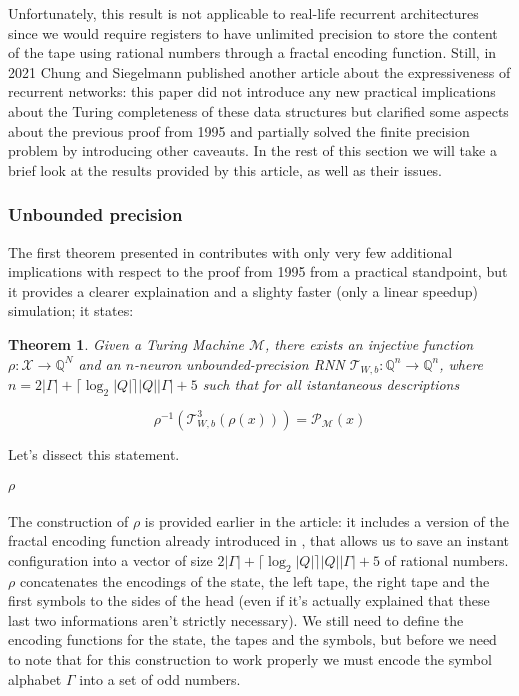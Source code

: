 \documentclass{article}
\newtheorem{theorem}{Theorem}
\begin{document}
Unfortunately, this result is not applicable to real-life recurrent architectures since we would require registers to have unlimited precision to store the content of the tape using rational numbers through a fractal encoding function.
Still, in 2021 Chung and Siegelmann published another article \cite{CHU21} about the expressiveness of recurrent networks: this paper did not introduce any new practical implications about the Turing completeness of these data structures but clarified some aspects about the previous proof from 1995 and partially solved the finite precision problem by introducing other caveauts. In the rest of this section we will take a brief look at the results provided by this article, as well as their issues.

\subsubsection{Unbounded precision}

The first theorem presented in \cite{CHU21} contributes with only very few additional implications with respect to the proof from 1995 from a practical standpoint, but it provides a clearer explaination and a slighty faster (only a linear speedup) simulation; it states:

\begin{theorem}\label{th:theorem1}
    Given a Turing Machine $\mathcal{M}$, there exists an injective function $\rho: \mathcal{X} \rightarrow \mathbb{Q}^N$ and an $n$-neuron unbounded-precision RNN $\mathcal{T}_{W,b}: \mathbb{Q}^n \rightarrow \mathbb{Q}^n$, where $n=2|\Gamma|+\lceil \log_2|Q|\rceil |Q||\Gamma| + 5$ such that for all istantaneous descriptions
    
    $$\rho^{-1}(\mathcal{T}^3_{W,b}(\rho(x))) = \mathcal{P}_{\mathcal{M}}(x)$$
\end{theorem}

Let's dissect this statement.

\paragraph{$\rho$}
The construction of $\rho$ is provided earlier in the article: it includes a version of the fractal encoding function already introduced in \cite{SIE95}, that allows us to save an instant configuration into a vector of size $2|\Gamma|+\lceil \log_2|Q|\rceil |Q||\Gamma| + 5$ of rational numbers. $\rho$ concatenates the encodings of the state, the left tape, the right tape and the first symbols to the sides of the head (even if it's actually explained that these last two informations aren't strictly necessary). We still need to define the encoding functions for the state, the tapes and the symbols, but before we need to note that for this construction to work properly we must encode the symbol alphabet $\Gamma$ into a set of odd numbers.
\end{document}
